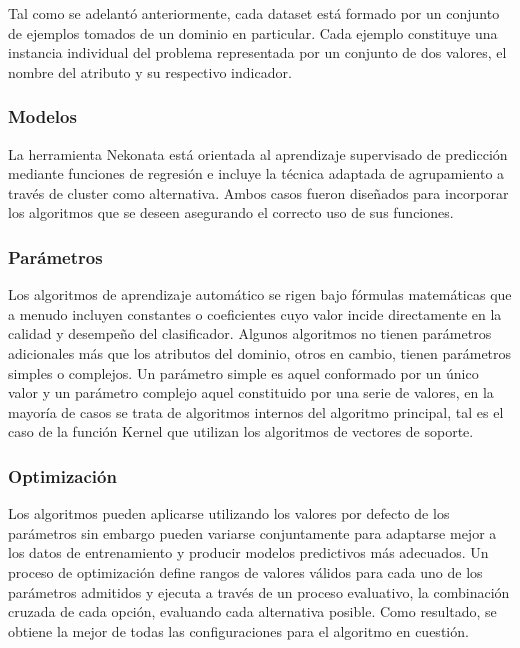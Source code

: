 Tal como se adelantó anteriormente, cada dataset está formado por
un conjunto de ejemplos tomados de un dominio en particular. Cada
ejemplo constituye una instancia individual del problema representada
por un conjunto de dos valores, el nombre del atributo y su respectivo
indicador.


\subsubsection*{Modelos}

La herramienta Nekonata está orientada al aprendizaje supervisado
de predicción mediante funciones de regresión e incluye la técnica
adaptada de agrupamiento a través de cluster como alternativa. Ambos
casos fueron diseñados para incorporar los algoritmos que se deseen
asegurando el correcto uso de sus funciones.


\subsubsection*{Parámetros}

Los algoritmos de aprendizaje automático se rigen bajo fórmulas matemáticas
que a menudo incluyen constantes o coeficientes cuyo valor incide
directamente en la calidad y desempeño del clasificador. Algunos algoritmos
no tienen parámetros adicionales más que los atributos del dominio,
otros en cambio, tienen parámetros simples o complejos. Un parámetro
simple es aquel conformado por un único valor y un parámetro complejo
aquel constituido por una serie de valores, en la mayoría de casos
se trata de algoritmos internos del algoritmo principal, tal es el
caso de la función Kernel que utilizan los algoritmos de vectores
de soporte. 


\subsubsection*{Optimización}

Los algoritmos pueden aplicarse utilizando los valores por defecto
de los parámetros sin embargo pueden variarse conjuntamente para adaptarse
mejor a los datos de entrenamiento y producir modelos predictivos
más adecuados. Un proceso de optimización define rangos de valores
válidos para cada uno de los parámetros admitidos y ejecuta a través
de un proceso evaluativo, la combinación cruzada de cada opción, evaluando
cada alternativa posible. Como resultado, se obtiene la mejor de todas
las configuraciones para el algoritmo en cuestión.

